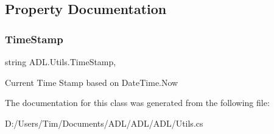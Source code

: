 \subsection{Property Documentation}
\mbox{\label{class_a_d_l_1_1_utils_a93a1013d16031cf968a4383b56f4b24f}} 
\subsubsection{\texorpdfstring{Time\+Stamp}{TimeStamp}}
{\footnotesize\ttfamily string A\+D\+L.\+Utils.\+Time\+Stamp\hspace{0.3cm}{\ttfamily [static]}, {\ttfamily [get]}}



Current Time Stamp based on Date\+Time.\+Now 



The documentation for this class was generated from the following file\+:\begin{DoxyCompactItemize}
\item 
D\+:/\+Users/\+Tim/\+Documents/\+A\+D\+L/\+A\+D\+L/\+A\+D\+L/Utils.\+cs\end{DoxyCompactItemize}
